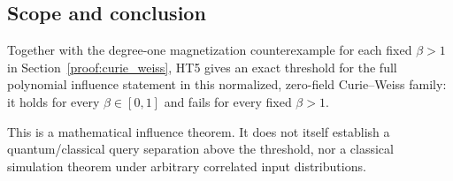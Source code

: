 \subsection{Scope and conclusion}\label{ht:scope-and-conclusion}

Together with the degree-one magnetization counterexample for each fixed \(\beta>1\) in Section~\ref{proof:curie_weiss}, HT5 gives an exact threshold for the full polynomial influence statement in this normalized, zero-field Curie--Weiss family: it holds for every \(\beta \in [0,1]\) and fails for every fixed \(\beta>1\).

This is a mathematical influence theorem. It does not itself establish a quantum/classical query separation above the threshold, nor a classical simulation theorem under arbitrary correlated input distributions.

\endgroup
